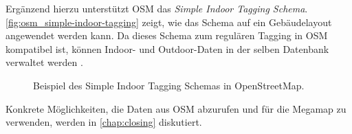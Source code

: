 Ergänzend hierzu unterstützt OSM das \emph{Simple Indoor Tagging Schema}.
\autoref{fig:osm_simple-indoor-tagging} zeigt, wie das Schema auf ein Gebäudelayout angewendet werden kann.
Da dieses Schema zum regulären Tagging in OSM kompatibel ist, können Indoor- und Outdoor-Daten in der selben Datenbank verwaltet werden \parencite{OpenStreetMapFoundation2018c}.
\begin{figure}[tbh]
    \centering
    \caption{Beispiel des Simple Indoor Tagging Schemas in OpenStreetMap. %
    }
    \label{fig:osm_simple-indoor-tagging}
\end{figure}

Konkrete Möglichkeiten, die Daten aus OSM abzurufen und für die Megamap zu verwenden, werden in \autoref{chap:closing} diskutiert.
%
\cleardoublepage
